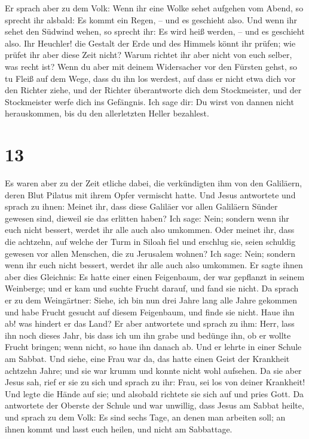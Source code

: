  Er sprach aber zu dem Volk: Wenn ihr eine Wolke sehet
aufgehen vom Abend, so sprecht ihr alsbald: Es kommt ein Regen, -- und
es geschieht also.  Und wenn ihr sehet den Südwind wehen,
so sprecht ihr: Es wird heiß werden, -- und es geschieht also.
 Ihr Heuchler! die Gestalt der Erde und des Himmels könnt
ihr prüfen; wie prüfet ihr aber diese Zeit nicht?  Warum
richtet ihr aber nicht von euch selber, was recht ist? 
Wenn du aber mit deinem Widersacher vor den Fürsten gehst, so tu Fleiß
auf dem Wege, dass du ihn los werdest, auf dass er nicht etwa dich vor
den Richter ziehe, und der Richter überantworte dich dem Stockmeister,
und der Stockmeister werfe dich ins Gefängnis.  Ich sage
dir: Du wirst von dannen nicht herauskommen, bis du den allerletzten
Heller bezahlest.

\hypertarget{section-12}{%
\section{13}\label{section-12}}

 Es waren aber zu der Zeit etliche dabei, die verkündigten
ihm von den Galiläern, deren Blut Pilatus mit ihrem Opfer vermischt
hatte.  Und Jesus antwortete und sprach zu ihnen: Meinet
ihr, dass diese Galiläer vor allen Galiläern Sünder gewesen sind,
dieweil sie das erlitten haben?  Ich sage: Nein; sondern
wenn ihr euch nicht bessert, werdet ihr alle auch also umkommen.
 Oder meinet ihr, dass die achtzehn, auf welche der Turm
in Siloah fiel und erschlug sie, seien schuldig gewesen vor allen
Menschen, die zu Jerusalem wohnen?  Ich sage: Nein;
sondern wenn ihr euch nicht bessert, werdet ihr alle auch also umkommen.
 Er sagte ihnen aber dies Gleichnis: Es hatte einer einen
Feigenbaum, der war gepflanzt in seinem Weinberge; und er kam und suchte
Frucht darauf, und fand sie nicht.  Da sprach er zu dem
Weingärtner: Siehe, ich bin nun drei Jahre lang alle Jahre gekommen und
habe Frucht gesucht auf diesem Feigenbaum, und finde sie nicht. Haue ihn
ab! was hindert er das Land?  Er aber antwortete und
sprach zu ihm: Herr, lass ihn noch dieses Jahr, bis dass ich um ihn
grabe und bedünge ihn,  ob er wollte Frucht bringen; wenn
nicht, so haue ihn danach ab.  Und er lehrte in einer
Schule am Sabbat.  Und siehe, eine Frau war da, das hatte
einen Geist der Krankheit achtzehn Jahre; und sie war krumm und konnte
nicht wohl aufsehen.  Da sie aber Jesus sah, rief er sie
zu sich und sprach zu ihr: Frau, sei los von deiner Krankheit!
 Und legte die Hände auf sie; und alsobald richtete sie
sich auf und pries Gott.  Da antwortete der Oberste der
Schule und war unwillig, dass Jesus am Sabbat heilte, und sprach zu dem
Volk: Es sind sechs Tage, an denen man arbeiten soll; an ihnen kommt und
lasst euch heilen, und nicht am Sabbattage.

